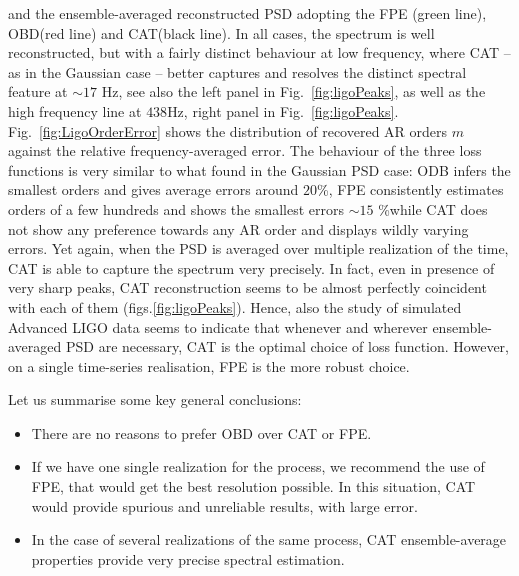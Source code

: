 \documentclass[twocolumn,showpacs,preprintnumbers,nofootinbib,prd,
superscriptaddress,10pt]{revtex4-1}
\begin{document}
and the ensemble-averaged reconstructed PSD adopting the FPE (green line), OBD(red line) and CAT(black line). In all cases, the spectrum is well reconstructed, but with a fairly distinct behaviour at low frequency, where CAT -- as in the Gaussian case -- better captures and resolves the distinct 
spectral feature at $\sim 17$ Hz, see also the left panel in Fig.~\ref{fig:ligoPeaks}, as well as the high frequency line at $438$Hz, right panel in Fig.~\ref{fig:ligoPeaks}. 
Fig.~\ref{fig:LigoOrderError} shows the distribution of recovered AR orders $m$ against the relative frequency-averaged error. The behaviour
of the three loss functions is very similar to what found in the Gaussian PSD case: ODB infers the smallest orders and gives average errors around $20$\%, FPE consistently estimates orders of a few hundreds and shows the smallest errors $\sim 15$ \%while CAT does not show any preference towards any AR order and displays wildly varying errors. Yet again, when the PSD is averaged over multiple realization of the time, CAT is able to capture the spectrum very precisely. In fact, even in presence of very sharp peaks, CAT reconstruction seems to be almost perfectly coincident with each of them (figs.\ref{fig:ligoPeaks}).
Hence, also the study of simulated Advanced LIGO data seems to indicate that whenever and wherever ensemble-averaged PSD are necessary, CAT is the optimal choice of loss function. However, on a single time-series realisation, FPE is the more robust choice.

Let us summarise some key general conclusions:
\begin{itemize}
	\item There are no reasons to prefer OBD over CAT or FPE.
	\item If we have one single realization for the process, we recommend the use of FPE, that would get the best resolution possible. In this situation, CAT would provide spurious and unreliable results, with large error.
	\item In the case of several realizations of the same process, CAT ensemble-average properties provide very precise spectral estimation.\end{itemize}
\end{document}
